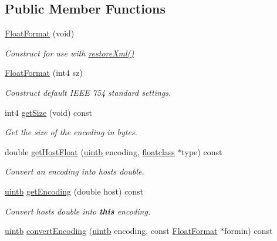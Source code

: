 \subsection*{Public Member Functions}
\begin{DoxyCompactItemize}
\item 
\mbox{\hyperlink{class_float_format_aac151782bc5f16b0854ea3da1feec4a9}{Float\+Format}} (void)
\begin{DoxyCompactList}\small\item\em Construct for use with \mbox{\hyperlink{class_float_format_aa6e0b189a1a66251b200fcf829d98356}{restore\+Xml()}} \end{DoxyCompactList}\item 
\mbox{\hyperlink{class_float_format_a0c5efdce272fb2a9b63f05affedbb74a}{Float\+Format}} (int4 sz)
\begin{DoxyCompactList}\small\item\em Construct default I\+E\+EE 754 standard settings. \end{DoxyCompactList}\item 
int4 \mbox{\hyperlink{class_float_format_ad8a88c53da2b55aae1c707a33a53c501}{get\+Size}} (void) const
\begin{DoxyCompactList}\small\item\em Get the size of the encoding in bytes. \end{DoxyCompactList}\item 
double \mbox{\hyperlink{class_float_format_a5205f99f7973cde7ffe0054d07cf82bc}{get\+Host\+Float}} (\mbox{\hyperlink{types_8h_a2db313c5d32a12b01d26ac9b3bca178f}{uintb}} encoding, \mbox{\hyperlink{class_float_format_a18acf57dc2fa19c8afe87fa1f61a0481}{floatclass}} $\ast$type) const
\begin{DoxyCompactList}\small\item\em Convert an encoding into host\textquotesingle{}s double. \end{DoxyCompactList}\item 
\mbox{\hyperlink{types_8h_a2db313c5d32a12b01d26ac9b3bca178f}{uintb}} \mbox{\hyperlink{class_float_format_a6f8450c4637e1e2c098b6b1c38f6061f}{get\+Encoding}} (double host) const
\begin{DoxyCompactList}\small\item\em Convert host\textquotesingle{}s double into {\bfseries{this}} encoding. \end{DoxyCompactList}\item 
\mbox{\hyperlink{types_8h_a2db313c5d32a12b01d26ac9b3bca178f}{uintb}} \mbox{\hyperlink{class_float_format_a8b9460ada306b44861228990529d5410}{convert\+Encoding}} (\mbox{\hyperlink{types_8h_a2db313c5d32a12b01d26ac9b3bca178f}{uintb}} encoding, const \mbox{\hyperlink{class_float_format}{Float\+Format}} $\ast$formin) const

\end{DoxyCompactItemize}
